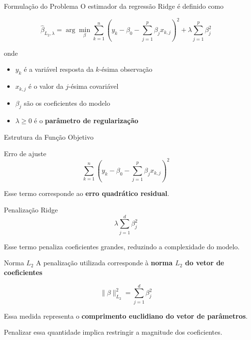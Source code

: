 \documentclass[
  ignorenonframetext,
  aspectratio=169,
]{beamer}
\providecommand{\tightlist}{%
  \setlength{\itemsep}{0pt}\setlength{\parskip}{0pt}}
\begin{document}
\begin{frame}
\begin{block}{Formulação do Problema}
\label{formulauxe7uxe3o-do-problema-1}
O estimador da regressão Ridge é definido como

\[
\hat{\beta}_{L_2,\lambda}
=
\arg\min_{\beta}
\sum_{k=1}^{n}
\left(
y_k - \beta_0 - \sum_{j=1}^{p} \beta_j x_{k,j}
\right)^2
+
\lambda \sum_{j=1}^{p} \beta_j^2
\]

onde

\begin{itemize}
\tightlist
\item
  \(y_k\) é a variável resposta da \(k\)-ésima observação\\
\item
  \(x_{k,j}\) é o valor da \(j\)-ésima covariável\\
\item
  \(\beta_j\) são os coeficientes do modelo\\
\item
  \(\lambda \ge 0\) é o \textbf{parâmetro de regularização}
\end{itemize}
\end{block}
\end{frame}

\begin{frame}
\begin{block}{Estrutura da Função Objetivo}
\label{estrutura-da-funuxe7uxe3o-objetivo}
\begin{block}{Erro de ajuste}
\label{erro-de-ajuste}
\[
\sum_{k=1}^{n}
\left(
y_k - \beta_0 - \sum_{j=1}^{p} \beta_j x_{k,j}
\right)^2
\]

Esse termo corresponde ao \textbf{erro quadrático residual}.
\end{block}

\begin{block}{Penalização Ridge}
\label{penalizauxe7uxe3o-ridge}
\[
\lambda \sum_{j=1}^{d} \beta_j^2
\]

Esse termo penaliza coeficientes grandes, reduzindo a complexidade do
modelo.
\end{block}
\end{block}
\end{frame}

\begin{frame}
\begin{block}{Norma \(L_2\)}
\label{norma-l_2}
A penalização utilizada corresponde à \textbf{norma \(L_2\) do vetor de
coeficientes}

\[
\|\beta\|_{L_2}^2
=
\sum_{j=1}^{d} \beta_j^2
\]

Essa medida representa o \textbf{comprimento euclidiano do vetor de
parâmetros}.

Penalizar essa quantidade implica restringir a magnitude dos
coeficientes.
\end{block}
\end{frame}
\end{document}
